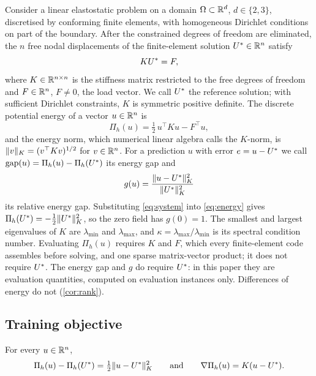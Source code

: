 Consider a linear elastostatic problem on a domain $\Omega\subset\mathbb{R}^{d}$, $d\in\{2,3\}$,
discretised by conforming finite elements, with homogeneous Dirichlet conditions on part
of the boundary. After the constrained degrees of freedom are eliminated, the $n$ free
nodal displacements of the finite-element solution $U^{\ast}\in\mathbb{R}^{n}$ satisfy
\begin{equation}
KU^{\ast} = F,
\label{eq:system}
\end{equation}
where $K\in\mathbb{R}^{n\times n}$ is the stiffness matrix restricted to the free degrees of
freedom and $F\in\mathbb{R}^{n}$, $F\neq0$, the load vector. We call $U^{\ast}$ the reference
solution; with sufficient Dirichlet constraints, $K$ is symmetric positive definite. The
discrete potential energy of a vector $u\in\mathbb{R}^{n}$ is
\begin{equation}
\Pi_h(u) = \tfrac12\,u^{\top}Ku - F^{\top}u ,
\label{eq:energy}
\end{equation}
and the energy norm, which numerical linear algebra calls the $K$-norm, is
$\lVert v\rVert_K=(v^{\top}Kv)^{1/2}$ for $v\in\mathbb{R}^{n}$. For a prediction $u$ with error
$e=u-U^{\ast}$ we call $\operatorname{gap}(u)=\Pi_h(u)-\Pi_h(U^{\ast})$ its energy gap and
\begin{equation}
g(u) = \frac{\lVert u-U^{\ast}\rVert_K^{2}}{\lVert U^{\ast}\rVert_K^{2}}
\label{eq:relgap}
\end{equation}
its relative energy gap. Substituting \eqref{eq:system} into \eqref{eq:energy} gives
$\Pi_h(U^{\ast})=-\tfrac12\lVert U^{\ast}\rVert_K^2$, so the zero field has $g(0)=1$. The smallest and
largest eigenvalues of $K$ are $\lambda_{\min}$ and $\lambda_{\max}$, and
$\kappa=\lambda_{\max}/\lambda_{\min}$ is its spectral condition number. Evaluating
$\Pi_h(u)$ requires $K$ and $F$, which every finite-element code assembles before solving,
and one sparse matrix-vector product; it does not require $U^{\ast}$. The energy gap and $g$
do require $U^{\ast}$: in this paper they are evaluation quantities, computed on evaluation
instances only. Differences of energy do not (\cref{cor:rank}).

\subsection{Training objective}\label{sec:theory:exact}

\begin{lemma}[Exactness]\label{lem:exact}
For every $u\in\mathbb{R}^{n}$,
\begin{equation}
\Pi_h(u)-\Pi_h(U^{\ast}) = \tfrac12\lVert u-U^{\ast}\rVert_K^{2}
\qquad\text{and}\qquad
\nabla\Pi_h(u) = K(u-U^{\ast}).
\label{eq:exact}
\end{equation}
\end{lemma}

